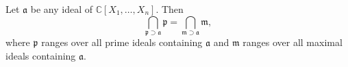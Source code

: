 Let $\mathfrak{a}$ be any ideal of $\mathbb{C}[X_1, \ldots, X_n]$. Then
$$\bigcap_{\mathfrak{p} \supset \mathfrak{a}} \mathfrak{p} = \bigcap_{\mathfrak{m} \supset \mathfrak{a}} \mathfrak{m},$$
where $\mathfrak{p}$ ranges over all prime ideals containing $\mathfrak{a}$ and $\mathfrak{m}$ ranges over all maximal ideals containing $\mathfrak{a}$.
